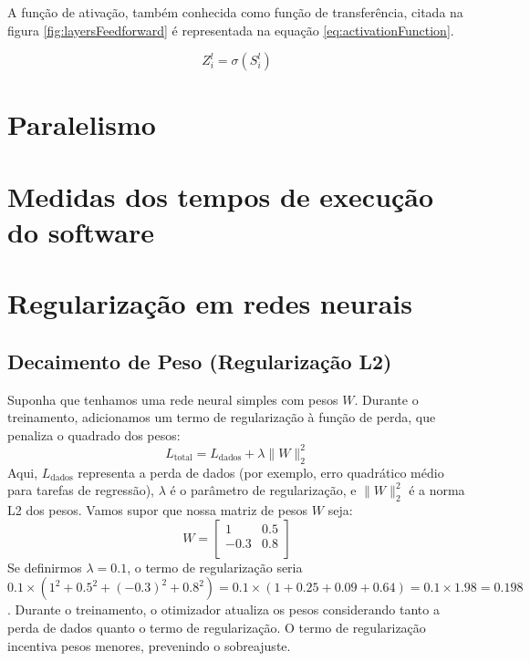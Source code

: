 \begin{apendicesenv}
	\par A função de ativação, também conhecida como função de transferência, citada na figura \ref{fig:layersFeedforward} é representada na equação \ref{eq:activationFunction}.
	
	\begin{equation}\label{eq:activationFunction}
		Z^l_i = \sigma(S^l_i)
	\end{equation}
	
	\chapter{Paralelismo}
		\par 
		
		\chapter{Medidas dos tempos de execução do software}



	\chapter{Regularização em redes neurais}
	\label{chap:regularizacao}

	\section{Decaimento de Peso (Regularização L2)}
		\label{Apend:regularization}
		\par Suponha que tenhamos uma rede neural simples com pesos \( W \). Durante o treinamento, adicionamos um termo de regularização à função de perda, que penaliza o quadrado dos pesos:
		\begin{equation}
			L_{\text{total}} = L_{\text{dados}} + \lambda \|W\|^2_2
		\end{equation}
		Aqui, \( L_{\text{dados}} \) representa a perda de dados (por exemplo, erro quadrático médio para tarefas de regressão), \( \lambda \) é o parâmetro de regularização, e \( \|W\|^2_2 \) é a norma L2 dos pesos.
		Vamos supor que nossa matriz de pesos \( W \) seja:
		\[ W = \begin{bmatrix} 
			1 & 0.5 \\
			-0.3 & 0.8 \\
		\end{bmatrix} \]
		Se definirmos \( \lambda = 0.1 \), o termo de regularização seria \( 0.1 \times (1^2 + 0.5^2 + (-0.3)^2 + 0.8^2) = 0.1 \times (1 + 0.25 + 0.09 + 0.64) = 0.1 \times 1.98 = 0.198 \).
		Durante o treinamento, o otimizador atualiza os pesos considerando tanto a perda de dados quanto o termo de regularização. O termo de regularização incentiva pesos menores, prevenindo o sobreajuste.


\end{apendicesenv}
